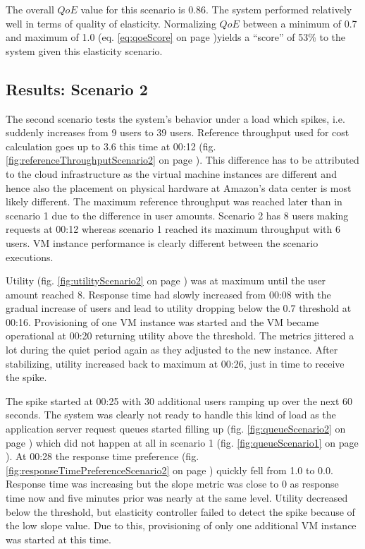 \documentclass[english]{tktltiki2}
\theoremstyle{definition}
\theoremstyle{remark}
\begin{document}
The overall $QoE$ value for this scenario is $0.86$. The system performed
relatively well in terms of quality of elasticity. Normalizing $QoE$ between a
minimum of 0.7 and maximum of 1.0 (eq. \ref{eq:qoeScore} on page
\pageref{eq:qoeScore})yields a ``score'' of 53\% to the system given this
elasticity scenario.

\subsection{Results: Scenario 2}

The second scenario tests the system's behavior under a load which spikes, i.e.
suddenly increases from 9 users to 39 users. Reference throughput used for cost
calculation goes up to $3.6$ this time at 00:12 (fig.
\ref{fig:referenceThroughputScenario2} on page
\pageref{fig:referenceThroughputScenario2}). This difference has to be
attributed to the cloud infrastructure as the virtual machine instances are
different and hence also the placement on physical hardware at Amazon's data
center is most likely different. The maximum reference throughput was reached
later than in scenario 1 due to the difference in user amounts. Scenario 2 has 8
users making requests at 00:12 whereas scenario 1 reached its maximum throughput
with 6 users. VM instance performance is clearly different between the scenario
executions.

Utility (fig. \ref{fig:utilityScenario2} on page \pageref{fig:utilityScenario2})
was at maximum until the user amount reached 8. Response time had slowly
increased from 00:08 with the gradual increase of users and lead to utility
dropping below the $0.7$ threshold at 00:16. Provisioning of one VM instance was
started and the VM became operational at 00:20 returning utility above the
threshold. The metrics jittered a lot during the quiet period again as they
adjusted to the new instance. After stabilizing, utility increased back to
maximum at 00:26, just in time to receive the spike.

The spike started at 00:25 with 30 additional users ramping up over the next 60
seconds. The system was clearly not ready to handle this kind of load as the
application server request queues started filling up (fig.
\ref{fig:queueScenario2} on page \pageref{fig:queueScenario2}) which did not
happen at all in scenario 1 (fig. \ref{fig:queueScenario1} on page
\pageref{fig:queueScenario1}). At 00:28 the response time preference (fig.
\ref{fig:responseTimePreferenceScenario2} on page
\pageref{fig:responseTimePreferenceScenario2}) quickly fell from 1.0 to 0.0.
Response time was increasing but the slope metric was close to 0 as response
time now and five minutes prior was nearly at the same level. Utility decreased
below the threshold, but elasticity controller failed to detect the spike
because of the low slope value. Due to this, provisioning of only one additional
VM instance was started at this time.
\end{document}
